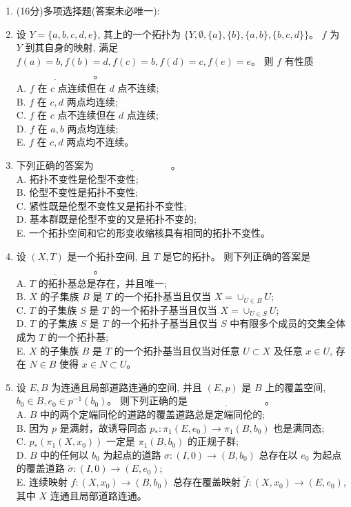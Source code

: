 \begin{enumerate}
\item[一、](16分)多项选择题(答案未必唯一):
  \item 设 $Y=\{a, b, c, d, e\}$, 
  其上的一个拓扑为 $\{Y, \emptyset,\{a\},\{b\},\{a, b\},\{b, c, d\}\}$。
  $f$ 为 $Y$ 到其自身的映射, 满足 $f(a)=b, f(b)=d, f(c)=b, f(d)=c, f(e)=e$。
  则 $f$ 有性质$\underline{\qquad\qquad\qquad\qquad}$。\\
A. $f$ 在 $c$ 点连续但在 $d$ 点不连续;\\
B. $f$ 在 $c, d$ 两点均连续;\\
C. $f$ 在 $c$ 点不连续但在 $d$ 点连续;\\
D. $f$ 在 $a, b$ 两点均连续;\\
E. $f$ 在 $c, d$ 两点均不连续。

  \item 下列正确的答案为$\underline{\qquad\qquad\qquad\qquad}$。\\
A. 拓扑不变性是伦型不变性;\\
B. 伦型不变性是拓扑不变性;\\
C. 紧性既是伦型不变性又是拓扑不变性;\\
D. 基本群既是伦型不变的又是拓扑不变的;\\
E. 一个拓扑空间和它的形变收缩核具有相同的拓扑不变性。

  \item 设 $(X, T)$ 是一个拓扑空间, 且 $T$ 是它的拓扑。
  则下列正确的答案是$\underline{\qquad\qquad\qquad\qquad}$。\\
A. $T$ 的拓扑基总是存在，并且唯一;\\
B. $X$ 的子集族 $B$ 是 $T$ 的一个拓扑基当且仅当 $X=\cup_{U \in B} U$;\\
C. $T$ 的子集族 $S$ 是 $T$ 的一个拓扑子基当且仅当 $X=\cup_{U \in S} U$;\\
D. $T$ 的子集族 $S$ 是 $T$ 的一个拓扑子基当且仅当 $S$ 中有限多个成员的交集全体成为 $T$ 的一个拓扑基;\\
E. $X$ 的子集族 $B$ 是 $T$ 的一个拓扑基当且仅当对任意 $U \subset X$ 
及任意 $x \in U$, 存在 $N \in B$ 使得 $x \in N \subset U$。

  \item 设 $E, B$ 为连通且局部道路连通的空间, 并且 $(E, p)$ 是 $B$ 上的覆盖空间, 
  $b_{0} \in B, e_{0} \in p^{-1}(b_{0})$。
  则下列正确的是$\underline{\qquad\qquad\qquad\qquad}$。\\
A. $B$ 中的两个定端同伦的道路的覆盖道路总是定端同伦的;\\
B. 因为 $p$ 是满射，故诱导同态 $p_{*}: \pi_{1}(E, e_{0}) \rightarrow \pi_{1}(B, b_{0})$ 也是满同态;\\
C. $p_{*}(\pi_{1}(X, x_{0}))$ 一定是 $\pi_{1}(B, b_{0})$ 的正规子群;\\
D. $B$ 中的任何以 $b_{0}$ 为起点的道路 $\sigma:(I, 0) \rightarrow(B, b_{0})$ 
总存在以 $e_{0}$ 为起点的覆盖道路 $\tilde{\sigma}:(I, 0) \rightarrow(E, e_{0})$;\\
E. 连续映射 $f:(X, x_{0}) \rightarrow (B, b_{0})$ 
总存在覆盖映射 $\tilde{f}:(X, x_{0}) \rightarrow (E, e_{0})$, 
其中 $X$ 连通且局部道路连通。


\end{enumerate}

